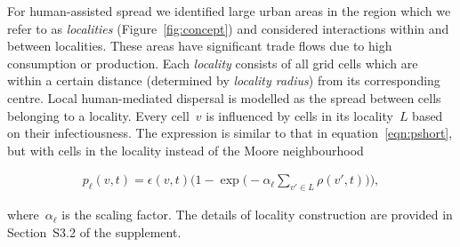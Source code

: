 \documentclass[11pt]{article}
\newcommand{\infest}{\rho}
\newcommand{\suitable}{\epsilon}
\newcommand{\plocal}{p_{\ell}}
\newcommand{\afm}{\alpha_{\ell}}
\newcommand{\locality}{{L}}
\theoremstyle{definition}
\begin{document}
For human-assisted spread we identified large urban areas in the region
which we refer to as {\it localities} (Figure~\ref{fig:concept}) and
considered interactions within and between localities. These areas have
significant trade flows due to high consumption or production. Each
\emph{locality} consists of all grid cells which are within a certain
distance (determined by \emph{locality radius}) from its corresponding
centre. Local human-mediated dispersal is modelled as the spread between
cells belonging to a locality.  Every cell~$v$ is influenced by cells in
its locality~$\locality$ based on their infectiousness.  The expression is
similar to that in equation~\eqref{eqn:pshort}, but with cells in the locality
instead of the Moore neighbourhood
\begin{linenomath}
\begin{align}\label{eqn:plocal}
    \plocal(v,t)=\suitable(v,t)\bigg(1-
    \exp\Big(-\afm\sum_{v'\in\locality}\infest(v',t)\Big)\bigg),
\end{align}
\end{linenomath}
where~$\afm$ is the scaling factor. The details of locality construction
are provided in Section~S3.2 of the supplement.
\end{document}
